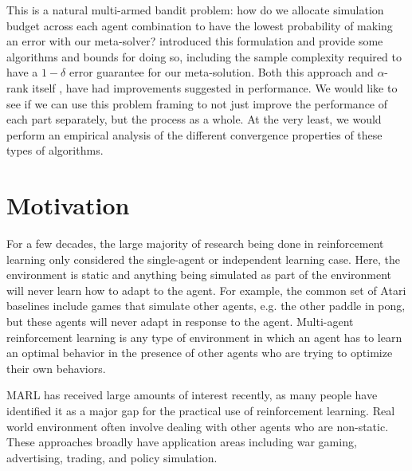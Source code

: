 \documentclass{article}
\begin{document}
This is a natural multi-armed bandit problem: how do we allocate simulation budget
across each agent combination to have the lowest probability of making an error with
our meta-solver? \cite{goodone} introduced this formulation and provide some algorithms
and bounds for doing so, including the sample complexity required to have a $1-\delta$ error
guarantee for our meta-solution. Both this approach \cite{IM} and $\alpha$-rank itself
\cite{alphaalpha}, have had improvements suggested in performance. We would like to
see if we can use this problem framing to not just improve the performance of
each part separately, but the process as a whole. At the very least, we would 
perform an empirical analysis of the different convergence properties of
these types of algorithms.

\section{Motivation}
For a few decades, the large majority of research being done in reinforcement
learning only considered the single-agent or independent learning case. Here, the environment is
static and anything being simulated as part of the environment will never learn how
to adapt to the agent. For example, the common set of Atari baselines
\cite{atari} include games that simulate other agents, e.g. the other paddle in
pong, but these agents will never adapt in response to the agent. Multi-agent
reinforcement learning is any type of environment in which an agent has to learn
an optimal behavior in the presence of other agents who are trying to optimize
their own behaviors. 

MARL has received large amounts of interest recently, as many people have
identified it as a major gap for the practical use of reinforcement learning.
Real world environment often involve dealing with other agents who are
non-static. These approaches broadly have application areas including war gaming,
advertising, trading, and policy simulation.
\end{document}
